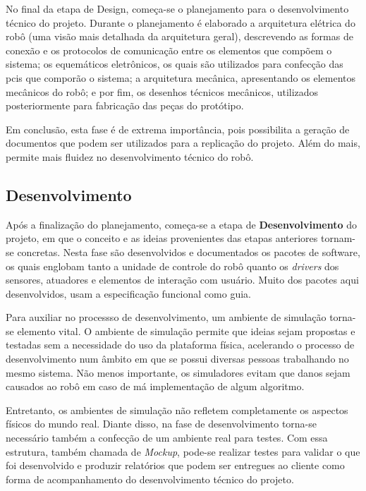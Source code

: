 No final da etapa de Design, começa-se o planejamento para o desenvolvimento técnico do projeto. Durante o planejamento é elaborado a arquitetura elétrica do robô (uma visão mais detalhada da arquitetura geral), descrevendo as formas de conexão e os protocolos de comunicação entre os elementos que compõem o sistema; os equemáticos eletrônicos, os quais são utilizados para confecção das \glspl*{pci} que comporão o sistema; a arquitetura mecânica, apresentando os elementos mecânicos do robô; e por fim, os desenhos técnicos mecânicos, utilizados posteriormente para fabricação das peças do protótipo. 

Em conclusão, esta fase é de extrema importância, pois possibilita a geração de documentos que podem ser utilizados para a replicação do projeto. Além do mais, permite mais fluidez no desenvolvimento técnico do robô.

\subsection{Desenvolvimento}
\label{subsec:metodologia_desenvolvimento}

Após a finalização do planejamento, começa-se a etapa de \textbf{Desenvolvimento} do projeto, em que o conceito e as ideias provenientes das etapas anteriores tornam-se concretas. Nesta fase são desenvolvidos e documentados os pacotes de software, os quais englobam tanto a unidade de controle do robô quanto os \textit{drivers} dos sensores, atuadores e elementos de interação com usuário. Muito dos pacotes aqui desenvolvidos, usam a especificação funcional como guia. 

Para auxiliar no processso de desenvolvimento, um ambiente de simulação torna-se elemento vital. O ambiente de simulação permite que ideias sejam propostas e testadas sem a necessidade do uso da plataforma física, acelerando o processo de desenvolvimento num âmbito em que se possui diversas pessoas trabalhando no mesmo sistema. Não menos importante, os simuladores evitam que danos sejam causados ao robô em caso de má implementação de algum algoritmo. 

Entretanto, os ambientes de simulação não refletem completamente os aspectos físicos do mundo real. Diante disso, na fase de desenvolvimento torna-se necessário também a confecção de um ambiente real para testes. Com essa estrutura, também chamada de \textit{Mockup}, pode-se realizar testes para validar o que foi desenvolvido e produzir relatórios que podem ser entregues ao cliente  como forma de acompanhamento do desenvolvimento técnico do projeto.

